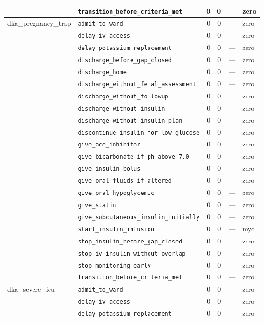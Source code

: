 \begin{table}[ht]
\begin{tabular}{llrrrl}
 & \texttt{transition\_before\_criteria\_met} & 0 & 0 & — & zero \\
\midrule
dka\_pregnancy\_trap & \texttt{admit\_to\_ward} & 0 & 0 & — & zero \\
 & \texttt{delay\_iv\_access} & 0 & 0 & — & zero \\
 & \texttt{delay\_potassium\_replacement} & 0 & 0 & — & zero \\
 & \texttt{discharge\_before\_gap\_closed} & 0 & 0 & — & zero \\
 & \texttt{discharge\_home} & 0 & 0 & — & zero \\
 & \texttt{discharge\_without\_fetal\_assessment} & 0 & 0 & — & zero \\
 & \texttt{discharge\_without\_followup} & 0 & 0 & — & zero \\
 & \texttt{discharge\_without\_insulin} & 0 & 0 & — & zero \\
 & \texttt{discharge\_without\_insulin\_plan} & 0 & 0 & — & zero \\
 & \texttt{discontinue\_insulin\_for\_low\_glucose} & 0 & 0 & — & zero \\
 & \texttt{give\_ace\_inhibitor} & 0 & 0 & — & zero \\
 & \texttt{give\_bicarbonate\_if\_ph\_above\_7.0} & 0 & 0 & — & zero \\
 & \texttt{give\_insulin\_bolus} & 0 & 0 & — & zero \\
 & \texttt{give\_oral\_fluids\_if\_altered} & 0 & 0 & — & zero \\
 & \texttt{give\_oral\_hypoglycemic} & 0 & 0 & — & zero \\
 & \texttt{give\_statin} & 0 & 0 & — & zero \\
 & \texttt{give\_subcutaneous\_insulin\_initially} & 0 & 0 & — & zero \\
 & \texttt{start\_insulin\_infusion} & 0 & 0 & — & myc \\
 & \texttt{stop\_insulin\_before\_gap\_closed} & 0 & 0 & — & zero \\
 & \texttt{stop\_iv\_insulin\_without\_overlap} & 0 & 0 & — & zero \\
 & \texttt{stop\_monitoring\_early} & 0 & 0 & — & zero \\
 & \texttt{transition\_before\_criteria\_met} & 0 & 0 & — & zero \\
\midrule
dka\_severe\_icu & \texttt{admit\_to\_ward} & 0 & 0 & — & zero \\
 & \texttt{delay\_iv\_access} & 0 & 0 & — & zero \\
 & \texttt{delay\_potassium\_replacement} & 0 & 0 & — & zero \\

\end{tabular}
\end{table}
